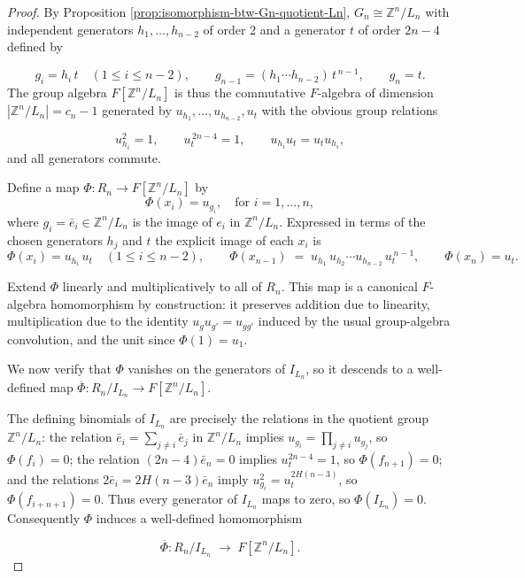\documentclass[11pt]{amsart}
\newcommand{\Z}{\mathbb{Z}}
\theoremstyle{plain}
\theoremstyle{definition}
\theoremstyle{remark}
\begin{document}
\begin{proof}
	By Proposition \ref{prop:isomorphism-btw-Gn-quotient-Ln}, \(  G_n \cong \mathbb{Z}^n / L_n \) with independent generators \( h_1, \dots, h_{n-2} \) of order 2 and a generator \( t\) of order \(2n-4\) defined by 
	
	$$
	g_i=h_i\,t\quad(1\le i\le n-2),\qquad g_{n-1}=(h_1\cdots h_{n-2})\,t^{\,n-1},\qquad g_n=t.
	$$ The group algebra $F[\mathbb{Z}^n/L_n]$ is thus the commutative $F$-algebra of dimension \( |\Z^n /L_n| = c_n -1 \) generated by $u_{h_1},\dots, u_{h_{n-2}}, u_t$ with the obvious group relations
	
	$$
	u_{h_i}^2=1,\qquad u_t^{\,2n-4}=1,\qquad u_{h_i}u_t=u_t u_{h_i},
	$$
	and all generators commute.
	
	Define a map \( \Phi: R_n \to F[\mathbb{Z}^n/L_n] \) by  
	\[
	\Phi(x_i) = u_{g_i}, \quad \text{for } i = 1, \dots, n,
	\]  
	where \( g_i = \bar{e}_i \in \mathbb{Z}^n / L_n  \) is the image of \( e_i \) in \( \mathbb{Z}^n / L_n  \).  Expressed in terms of the chosen generators \( h_j\) and \(t\) the explicit image of each \(x_i\) is 	
	$$
	\Phi(x_i)=u_{h_i}\,u_t \quad(1\le i\le n-2),\qquad \Phi(x_{n-1}) \;=\; u_{h_1}\,u_{h_2}\cdots u_{h_{n-2}}\,u_t^{\,n-1}, \qquad \Phi(x_n)=u_t. %
	$$
	
	Extend \( \Phi \) linearly and multiplicatively to all of \( R_n \). This map is a canonical \( F \)-algebra homomorphism by construction: it preserves addition due to linearity, multiplication due to the identity \( u_g u_{g'} = u_{gg'} \) induced by the usual group-algebra convolution, and the unit since \( \Phi(1) = u_1 \).
	
	We now verify that \( \Phi \) vanishes on the generators of \( I_{L_n} \), so it descends to a well-defined map \( \overline{\Phi}: R_n / I_{L_n} \to F[\mathbb{Z}^n / L_n] \). 
	
	The defining binomials of $I_{L_n}$ are precisely the relations in the quotient group $\mathbb{Z}^n/L_n$: the relation \( \bar{e}_i = \sum_{j \neq i} \bar{e}_j \) in \( \mathbb{Z}^n / L_n \) implies \( u_{g_i} = \prod_{j \neq i} u_{g_j} \), so \( \Phi(f_i) = 0 \); the relation \( (2n-4)\bar{e}_n = 0 \) implies \( u_t^{2n-4} = 1 \), so \( \Phi(f_{n+1}) = 0 \); and the relations \( 2\bar{e}_i = 2H(n-3)\bar{e}_n \) imply \( u_{g_i}^2 = u_t^{2H(n-3)} \), so \( \Phi(f_{i+n+1}) = 0 \). Thus every generator of $I_{L_n}$ maps to zero, so $\Phi(I_{L_n})=0$. Consequently $\Phi$ induces a well-defined homomorphism
	
	$$
	\overline{\Phi}:R_n/I_{L_n}\;\longrightarrow\;F[\mathbb{Z}^n/L_n].
	$$
	

\end{proof}
\end{document}

